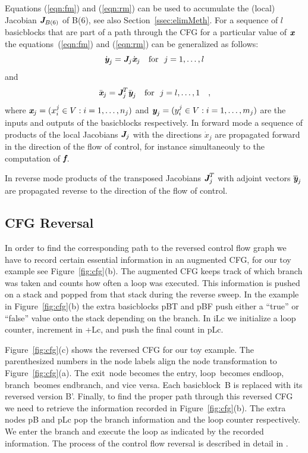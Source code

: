 \documentclass[acmtocl,acmnow]{acmtrans2m}
\newcommand{\entry}{entry}
\newcommand{\exit}{exit}
\newcommand{\Loop}{loop}
\newcommand{\EndLoop}{endloop}
\newcommand{\branch}{branch}
\newcommand{\EndBranch}{endbranch}
\newcommand{\basicblock}{basicblock}
\newcommand{\bmf}{\mbox{\bf\em f}}
\newcommand{\bmJ}{\mbox{\bf\em J}}
\newcommand{\bmx}{\mbox{\bf\em x}}
\newcommand{\bmy}{\mbox{\bf\em y}}
\newcommand{\reffig}[1]{Figure~\ref{#1}}
\newcommand{\refsec}[1]{Section~\ref{#1}}
\newcommand{\refeqn}[1]{(\ref{#1})}
\begin{document}
Equations \refeqn{eqn:fm} and \refeqn{eqn:rm} can be used to accumulate 
the (local) Jacobian $\bmJ_{B(6)}$
of B(6), see also \refsec{ssec:elimMeth}. 
For a sequence of $l$ {\basicblock}s that are part of 
a path through the CFG for a particular value of $\bmx$ the 
equations~(\ref{eqn:fm}) and (\ref{eqn:rm}) can be generalized as follows:
\begin{equation} \label{eqn:bbfm}
\dot{\bmy}_j=\bmJ_j \dot{\bmx}_j \quad \text{for}~~j=1,\ldots,l
\end{equation} 
and 
\begin{equation} \label{eqn:bbrm}
\bar{\bmx}_j=\bmJ^T_j \bar{\bmy}_j \quad \text{for}~~j=l,\ldots,1\quad ,
\end{equation} 
where $\bmx_j = (x^j_i \in V :  i=1,\ldots,n_j)$ and
$\bmy_j = (y^j_i \in V : i=1,\ldots,m_j)$ are the inputs and outputs of the 
{\basicblock}s
respectively. 
In forward mode a sequence of 
products of the local Jacobians $\bmJ_j$ 
with the directions $\dot{x}_j$ 
are propagated forward in the direction of the flow of control, for 
instance simultaneouly to the computation of $\bmf$.
 
In reverse mode products of the transposed
Jacobians $\bmJ^T_j$ with adjoint vectors $\overline{\bmy}_j$
are propagated reverse to the direction of the flow of control. 
\subsection{CFG Reversal} \label{ssec:cfgReversal}
In order to find the corresponding path to the reversed control flow graph 
we have to record certain essential information in an augmented CFG,
for our toy example see \reffig{fig:cfg}(b).
The augmented CFG  keeps track of which branch was taken and counts how often a loop was 
executed.  
This information is pushed on  a stack and popped from that stack during the 
reverse sweep.  
In the example in \reffig{fig:cfg}(b) the extra {\basicblock}s pBT and pBF push 
either a ``true'' or ``false'' value onto the stack depending on the branch. 
In iLc we initialize a loop counter, increment in +Lc, and push the final 
count in pLc. 

\reffig{fig:cfg}(c) shows the reversed CFG for our toy example. 
The parenthesized numbers in the node labels align the 
node transformation to \reffig{fig:cfg}(a). 
The \exit\ node becomes 
the \entry, \Loop\ becomes \EndLoop, \branch\ beomes \EndBranch, and vice versa. 
Each \basicblock\  B is replaced with its reversed version B'.  
Finally, to find the proper path through this reversed CFG we need to retrieve 
the information recorded in  \reffig{fig:cfg}(b). The extra nodes pB and pLc 
pop the branch information and the loop counter respectively.  
We enter the branch and execute the loop as indicated by the recorded information. 
The process of the control flow reversal is described in detail in 
\cite{NULF04CFR}. 
\end{document}
